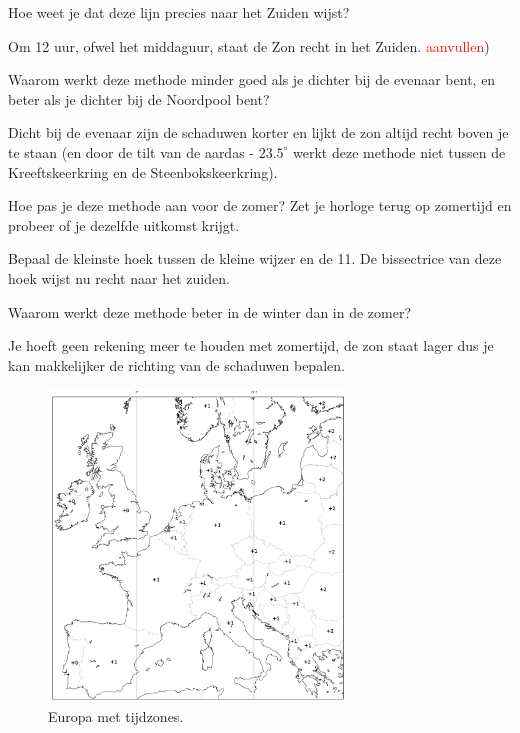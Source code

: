 \begin{opgave}
    Hoe weet je dat deze lijn precies naar het Zuiden wijst?
    \begin{antwoord}
        Om 12 uur, ofwel het middaguur, staat de Zon recht in het Zuiden. \textcolor{red}{aanvullen})
    \end{antwoord}
\end{opgave}

\begin{opgave}
    Waarom werkt deze methode minder goed als je dichter bij de evenaar bent, en beter als je dichter bij de Noordpool bent? 
    \begin{antwoord}
        Dicht bij de evenaar zijn de schaduwen korter en lijkt de zon altijd recht boven je te staan (en door de tilt van de aardas - $23.5^{\circ}$ werkt deze methode niet tussen de Kreeftskeerkring en de Steenbokskeerkring).
    \end{antwoord}
\end{opgave}

\begin{opgave}
    Hoe pas je deze methode aan voor de zomer? Zet je horloge terug op zomertijd en probeer of je dezelfde uitkomst krijgt.
    \begin{antwoord}
        Bepaal de kleinste hoek tussen de kleine wijzer en de 11. De bissectrice van deze hoek wijst nu recht naar het zuiden.   
    \end{antwoord}
\end{opgave}

\begin{opgave}
    Waarom werkt deze methode beter in de winter dan in de zomer? 
    \begin{antwoord}
        Je hoeft geen rekening meer te houden met zomertijd, de zon staat lager dus je kan makkelijker de richting van de schaduwen bepalen.
    \end{antwoord}
\end{opgave}

\begin{figure}
    \centering
    \includegraphics[width=0.7\textwidth]{europe_timezone_plus.png}
    \caption{Europa met tijdzones.}
\end{figure}


